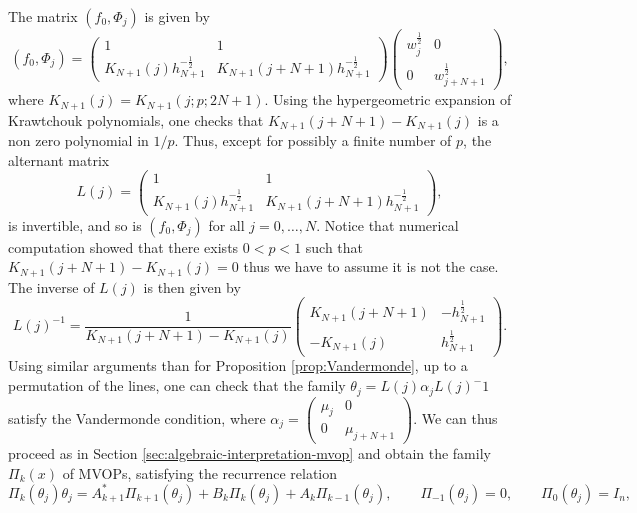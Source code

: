 \documentclass[a4paper,reqno]{amsart}
\theoremstyle{definition}
\numberwithin{equation}{section}
\begin{document}
The matrix $(f_0,\Phi_j)$ is given by 
\begin{equation}
(f_0,\Phi_j)=\begin{pmatrix}
1&1\\
K_{N+1}(j)h_{N+1}^{-\frac{1}{2}}&K_{N+1}(j+N+1)h_{N+1}^{-\frac{1}{2}}
\end{pmatrix} \begin{pmatrix}
w_{j}^{\frac{1}{2}}&0\\
0&w_{j+N+1}^{\frac{1}{2}}
\end{pmatrix},
\end{equation}
where $K_{N+1}(j)=K_{N+1}(j;p;2N+1)$. Using the hypergeometric expansion of Krawtchouk polynomials, one checks that $K_{N+1}(j+N+1)-K_{N+1}(j)$ is a non zero polynomial in $1/p$. Thus, except for possibly a finite number of $p$, the alternant matrix 
\begin{equation}
\label{eq:L-2nd-Krawt}
L(j)=\begin{pmatrix}
1&1\\
K_{N+1}(j)h_{N+1}^{-\frac{1}{2}}&K_{N+1}(j+N+1)h_{N+1}^{-\frac{1}{2}}
\end{pmatrix},
\end{equation}
 is invertible, and so is $(f_0,\Phi_j)$ for all $j=0,\ldots,N$. Notice that numerical computation showed that there exists $0<p<1$ such that $K_{N+1}(j+N+1)-K_{N+1}(j)=0$ thus we have to assume it is not the case. The inverse of $L(j)$ is then given by 
\begin{equation}
L(j)^{-1}=\frac{1}{K_{N+1}(j+N+1)-K_{N+1}(j)}\begin{pmatrix}
K_{N+1}(j+N+1)&-h_{N+1}^{\frac{1}{2}}\\
-K_{N+1}(j)&h_{N+1}^{\frac{1}{2}}
\end{pmatrix}.
\end{equation}
Using similar arguments than for Proposition \ref{prop:Vandermonde}, up to a permutation of the lines, one can check that the family $\theta_j=L(j)\alpha_jL(j)^-1$ satisfy the Vandermonde condition, where $\alpha_j=\begin{pmatrix}
    \mu_j&0\\0&\mu_{j+N+1}
\end{pmatrix}$. We can thus proceed as in Section \ref{sec:algebraic-interpretation-mvop} and obtain the family $\Pi_k(x)$ of MVOPs, satisfying the recurrence relation 
 \begin{equation}
\Pi_k(\theta_j)\theta_j=A_{k+1}^*\Pi_{k+1}(\theta_j)+B_k\Pi_k(\theta_j)+A_k\Pi_{k-1}(\theta_j), \qquad 
\Pi_{-1}(\theta_j)=0,\qquad \Pi_0(\theta_j)=I_n,
\end{equation}
\end{document}
